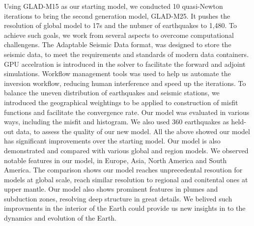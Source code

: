 Using GLAD-M15 as our starting model, we conducted 10 quasi-Newton iterations to bring
the second generation model, GLAD-M25. It pushes the resolution of global model to 17s
and the nubmer of earthquakes to 1,480. To achieve such goals, we work from several
aspects to overcome computational challengens. The Adaptable Seismic Data format,
was designed to store the seismic data, to meet the requirements and standards
of modern data containers. GPU accelration is introduced in the solver to facilitate
the forward and adjoint simulations. Workflow management tools was used to help
us automate the inversion workflow, reducing human interference and speed up the
iterations. To balance the uneven distribution of earthquakes and seismic stations,
we introduced the geographical weightings to be applied to construction of misfit
functions and facilitate the convergence rate. Our model was evaluated in various
ways, including the misfit and histogram. We also used 360 earthquakes as held-out
data, to assess the quality of our new model. All the above showed our model has
significant improvements over the starting model. Our model is also demonstrated
and compared with various global and region models. We observed notable features
in our model, in Europe, Asia, North America and South America. The comparison
shows our model reaches unprecedental resoution for models at global scale, reach
similar resolution to regional and conitental ones at upper mantle. Our model also
shows prominent features in plumes and subduction zones, resolving deep structure
in great details. We belived such improvments in the interior of the Earth could 
provide us new insights in to the dynamics and evolution of the Earth.

